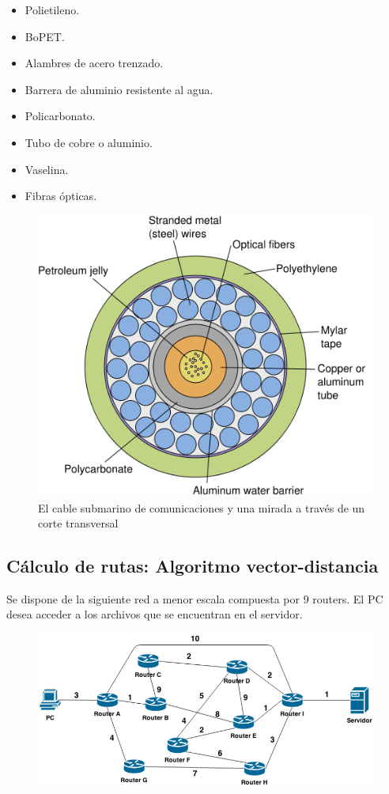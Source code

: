 \documentclass{article}
\begin{document}
\begin{itemize}
\item Polietileno.
\item BoPET.
\item Alambres de acero trenzado.
\item Barrera de aluminio resistente al agua.
\item Policarbonato.
\item Tubo de cobre o aluminio.
\item Vaselina.
\item Fibras ópticas.
\end{itemize}

\begin{figure}[H]
    \centering
    \includegraphics[scale=0.3]{cable}
    \caption{El cable submarino de comunicaciones y una mirada a través de un corte transversal}
\end{figure}

\subsection{Cálculo de rutas: Algoritmo vector-distancia}
Se dispone de la siguiente red a menor escala compuesta por 9 routers. El PC desea acceder a los archivos que se encuentran en el servidor.

\begin{figure}[H]
    \centering
    \includegraphics[scale=0.55]{grafo}
\end{figure}
\end{document}
